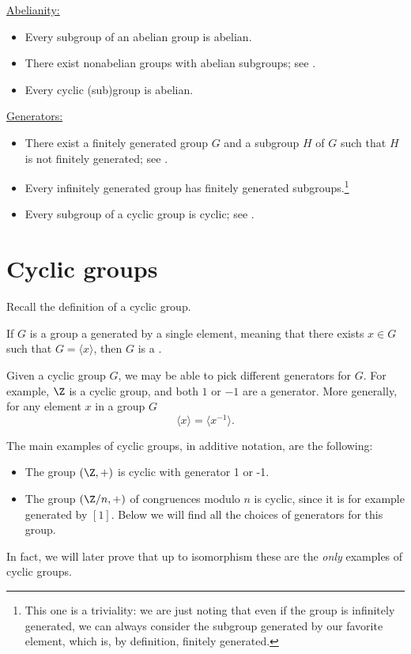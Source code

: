 \underline{Abelianity:}
\vspace{-0.3em}
\begin{itemize}[itemsep=-0.2em]
\item Every subgroup of an abelian group is abelian. 
\item There exist nonabelian groups with abelian subgroups; see .
\item Every cyclic (sub)group is abelian.
\end{itemize}

\underline{Generators:}
\vspace{-0.3em}
\begin{itemize}[itemsep=-0.2em]
\item There exist a finitely generated group $G$ and a subgroup $H$ of $G$ such that $H$ is not finitely generated; see .
\item Every infinitely generated group has finitely generated subgroups.\footnote{This one is a triviality: we are just noting that even if the group is infinitely generated, we can always consider the subgroup generated by our favorite element, which is, by definition, finitely generated.}
\item Every subgroup of a cyclic group is cyclic; see . 
\end{itemize}



\section{Cyclic groups}

Recall the definition of a cyclic group.

\begin{definition}
If $G$ is a group a generated by a single element, meaning that there exists $x \in G$ such that $G = \langle x \rangle$, then $G$ is a .
\end{definition}

\begin{remark}
Given a cyclic group $G$, we may be able to pick different generators for $G$. For example, $\Z$ is a cyclic group, and both $1$ or $-1$ are a generator. More generally, for any element $x$ in a group $G$
$$\langle x \rangle= \langle x^{-1}\rangle.$$
\end{remark}


\begin{example}
The main examples of cyclic groups, in additive notation, are the following:
\begin{itemize}
\item The group $(\Z,+)$ is cyclic with generator 1 or -1. 
\item The group $(\Z/n,+)$ of congruences modulo $n$ is cyclic, since it is for example generated by $[1]$. Below we will find all the choices of generators for this group.
\end{itemize}
In fact, we will later prove that up to isomorphism these are the {\em only} examples of cyclic groups.
\end{example}

